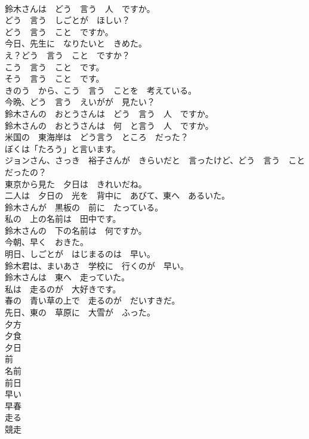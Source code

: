 \documentclass[8pt]{extreport}
\begin{document}
\begin{CJK}{UTF8}{min}
\\	鈴木さんは　どう　言う　人　ですか。	
\\	どう　言う　しごとが　ほしい？	
\\	どう　言う　こと　ですか。	
\\	今日、先生に　なりたいと　きめた。	
\\	え？どう　言う　こと　ですか？	
\\	こう　言う　こと　です。	
\\	そう　言う　こと　です。	
\\	きのう　から、こう　言う　ことを　考えている。	
\\	今晩、どう　言う　えいがが　見たい？	
\\	鈴木さんの　おとうさんは　どう　言う　人　ですか。	
\\	鈴木さんの　おとうさんは　何　と言う　人　ですか。	
\\	米国の　東海岸は　どう言う　ところ　だった？	
\\	ぼくは「たろう」と言います。	
\\	ジョンさん、さっき　裕子さんが　きらいだと　言ったけど、どう　言う　こと　だったの？	
\\	東京から見た　夕日は　きれいだね。	
\\	二人は　夕日の　光を　背中に　あびて、東へ　あるいた。	
\\	鈴木さんが　黒板の　前に　たっている。	
\\	私の　上の名前は　田中です。	
\\	鈴木さんの　下の名前は　何ですか。	
\\	今朝、早く　おきた。	
\\	明日、しごとが　はじまるのは　早い。	
\\	鈴木君は、まいあさ　学校に　行くのが　早い。	
\\	鈴木さんは　東へ　走っていた。	
\\	私は　走るのが　大好きです。	
\\	春の　青い草の上で　走るのが　だいすきだ。	
\\	先日、東の　草原に　大雪が　ふった。	
\\	夕方	
\\	夕食	
\\	夕日	
\\	前	
\\	名前	
\\	前日	
\\	早い	
\\	早春	
\\	走る	
\\	競走	

\end{CJK}
\end{document}
